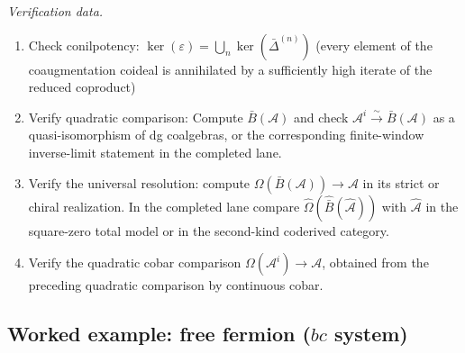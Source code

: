 \begin{procedure}
\emph{Verification data.}
\begin{enumerate}
\item Check conilpotency: $\ker(\varepsilon) = \bigcup_n \ker(\bar{\Delta}^{(n)})$ (every element of the coaugmentation coideal is annihilated by a sufficiently high iterate of the reduced coproduct)
\item Verify quadratic comparison: Compute $\bar{B}(\mathcal{A})$ and check
 $\mathcal{A}^i\xrightarrow{\sim}\bar{B}(\mathcal{A})$ as a
 quasi-isomorphism of dg coalgebras, or the corresponding
 finite-window inverse-limit statement in the completed lane.
\item Verify the universal resolution: compute
 $\Omega(\bar{B}(\mathcal{A}))\to\mathcal A$ in its strict or chiral
 realization.  In the completed lane compare
 $\widehat\Omega(\widehat{\bar B}(\widehat{\mathcal A}))$ with
 $\widehat{\mathcal A}$ in the square-zero total model or in the
 second-kind coderived category.
\item Verify the quadratic cobar comparison
 $\Omega(\mathcal A^i)\to\mathcal A$, obtained from the preceding
 quadratic comparison by continuous cobar.
\end{enumerate}
\end{procedure}

\subsection{\texorpdfstring{Worked example: free fermion ($bc$ system)}{Worked example: free fermion}}


